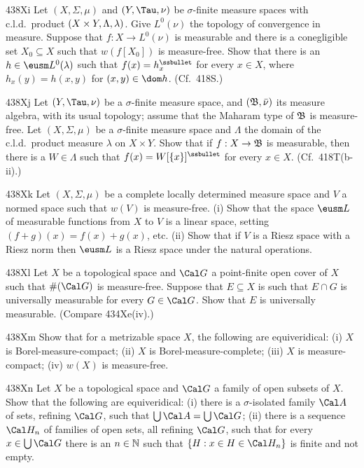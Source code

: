 {\spheader 438Xi Let $(X,\Sigma,\mu)$ and $(Y,\Tau,\nu)$ be
$\sigma$-finite measure spaces with c.l.d.\
product\discretionary{}{}{}
$(X\times Y,\discretionary{}{}{}\Lambda,\lambda)$.   Give $L^0(\nu)$ the
topology of convergence in measure.   Suppose that $f:X\to L^0(\nu)$ is
measurable and there is a conegligible set
$X_0\subseteq X$ such that $w(f[X_0])$ is measure-free.   Show that
there is an $h\in\eusm L^0(\lambda)$ such that $f(x)=h_x^{\ssbullet}$
for every $x\in X$, where $h_x(y)=h(x,y)$ for $(x,y)\in\dom h$.
(Cf.\ 418S.)

\spheader 438Xj Let $(Y,\Tau,\nu)$ be a
$\sigma$-finite measure space, and $(\frak B,\bar\nu)$ its measure
algebra,  with its usual topology;  assume that the Maharam type of
$\frak B$ is measure-free.
Let $(X,\Sigma,\mu)$ be a $\sigma$-finite measure space and
$\Lambda$ the domain of the c.l.d.\ product measure $\lambda$ on
$X\times Y$.   Show that if $f:X\to\frak B$ is measurable, then there is
a $W\in\Lambda$ such that $f(x)=W[\{x\}]^{\ssbullet}$ for every
$x\in X$.   (Cf.\ 418T(b-ii).)

\spheader 438Xk Let $(X,\Sigma,\mu)$ be a complete locally determined
measure space and $V$ a normed space such that $w(V)$ is measure-free.
(i) Show that the space $\eusm L$ of measurable functions from
$X$ to $V$ is a linear space, setting $(f+g)(x)=f(x)+g(x)$, etc.   (ii)
Show that if $V$ is a Riesz space with a Riesz norm then $\eusm L$ is a
Riesz space under the natural operations.

\sqheader 438Xl Let $X$ be a topological space and $\Cal G$ a
point-finite open cover of $X$ such that $\#(\Cal G)$ is measure-free.
Suppose that $E\subseteq X$ is such that $E\cap G$ is
universally measurable for every $G\in\Cal G$.   Show that $E$ is
universally measurable.    (Compare 434Xe(iv).)

\sqheader 438Xm Show
that for a metrizable space $X$, the following are equiveridical:
(i) $X$ is Borel-measure-compact;  (ii) $X$ is
Borel-measure-complete;  (iii) $X$ is measure-compact;
(iv) $w(X)$ is measure-free.

\spheader 438Xn Let $X$ be a topological space and $\Cal G$ a family of
open subsets of $X$.   Show that the following are equiveridical:  (i)
there is a $\sigma$-isolated family $\Cal A$ of sets, refining $\Cal G$,
such that $\bigcup\Cal A=\bigcup\Cal G$;  (ii) there is a sequence
$\Cal H_n$ of families of open sets, all refining $\Cal G$,
such that for every $x\in\bigcup\Cal G$ there is an $n\in\Bbb N$ such
that $\{H:x\in H\in\Cal H_n\}$ is finite and not empty.

}
